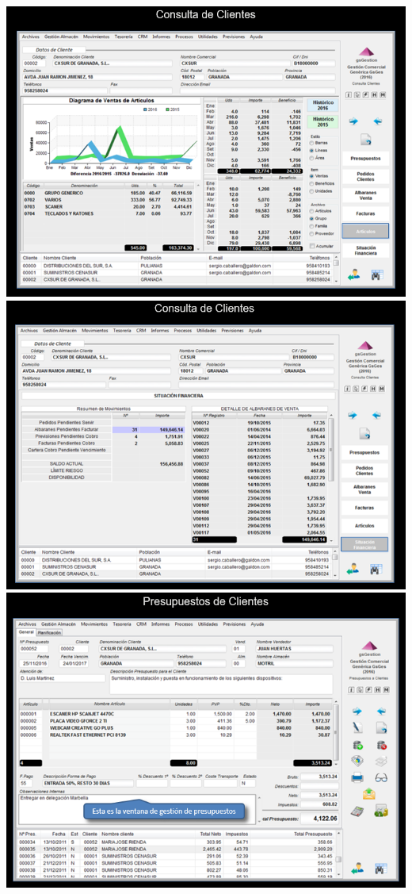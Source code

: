 \documentclass{article}
\begin{document}
\begin{itemize}
\begin{flushleft}
	\includegraphics[scale=0.65]{imagenes/CapturasoftwareSaaS1g.png}
	\includegraphics[scale=0.65]{imagenes/CapturasoftwareSaaS1h.png} 
	\includegraphics[scale=0.65]{imagenes/CapturasoftwareSaaS1i.png}

\end{flushleft}
\end{itemize}
\end{document}
